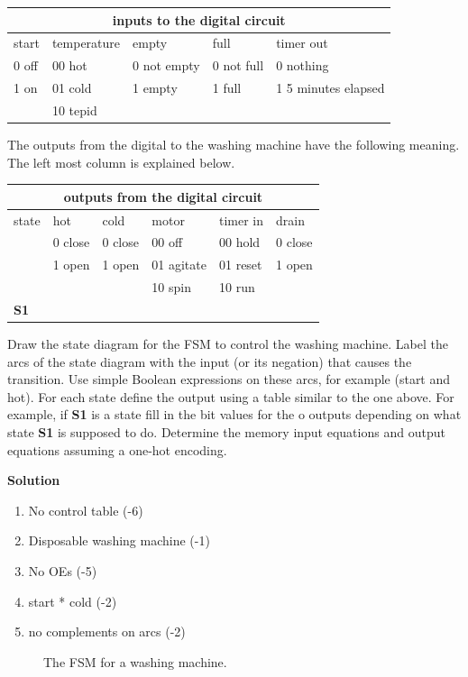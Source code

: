 \begin{enumerate}
\begin{tabular}{|l|l|l|l|l|} \hline
\multicolumn{5}{|c|}{inputs to the digital circuit}		\\ \hline \hline
start & temperature & empty       & full       & timer out 	\\ \hline	
0 off & 00 hot      & 0 not empty & 0 not full & 0 nothing	\\ \hline 
1 on  & 01 cold     & 1 empty     & 1 full     & 1 5 minutes elapsed 	\\ \hline 
      & 10 tepid    &		  &	       &		\\ \hline
\end{tabular}

The outputs from the digital to the washing machine have the following meaning.
The left most column is explained below.

\begin{tabular}{|l|||l|l|l|l|l|} \hline
\multicolumn{6}{|c|}{outputs from the digital circuit}			\\ \hline \hline
state & hot     & cold    & motor      & timer in   & drain 	\\ \hline
      & 0 close & 0 close & 00 off     & 00 hold    & 0 close	\\ \hline
      & 1 open  & 1 open  & 01 agitate & 01 reset   & 1 open	\\ \hline
      &		&         & 10 spin    & 10 run     &		\\ \hline \hline
\textbf{ S1}    &	&	  &	       &	    &		\\ \hline
\end{tabular}

Draw the state diagram for the FSM to control the washing machine.  
Label the arcs of the state diagram with the input (or its negation) 
that causes the transition.  Use simple Boolean expressions on these 
arcs, for example (start and hot).
For each state define the output using a table similar to the one above.
For example, if \textbf{ S1} is a state fill in the bit values for the o
outputs depending on what state \textbf{ S1} is supposed to do.
Determine the memory input equations and output equations assuming a one-hot 
encoding.

\begin{onlysolution}  \textbf{Solution} \itshape{
	\begin{enumerate}
	\item No control table (-6)
	\item Disposable washing machine (-1)
	\item No OEs (-5)
	\item start * cold (-2)
	\item no complements on arcs (-2)
	\end{enumerate}
\begin{figure}[ht]
\caption{The FSM for a washing machine.}
\end{figure}

}
\end{onlysolution}
\end{enumerate}
